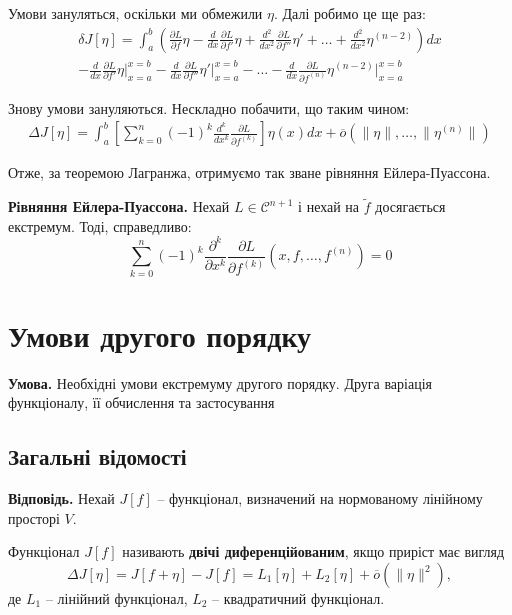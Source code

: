 \documentclass[14pt]{extarticle}
\newcommand{\<}{\langle}
\renewcommand{\>}{\rangle}
\theoremstyle{mystyle}{\newtheorem{definition}{Definition}[section]}
\theoremstyle{mystyle}{\newtheorem{proposition}[definition]{Proposition}}
\theoremstyle{mystyle}{\newtheorem{theorem}[definition]{Theorem}}
\theoremstyle{mystyle}{\newtheorem{lemma}[definition]{Lemma}}
\theoremstyle{mystyle}{\newtheorem{corollary}[definition]{Corollary}}
\theoremstyle{mystyle}{\newtheorem*{remark}{Remark}}
\theoremstyle{mystyle}{\newtheorem*{remarks}{Remarks}}
\theoremstyle{mystyle}{\newtheorem*{example}{Example}}
\theoremstyle{mystyle}{\newtheorem*{examples}{Examples}}
\theoremstyle{definition}{\newtheorem*{exercise}{Exercise}}
\theoremstyle{cstyle}{\newtheorem*{cthm}{}}
\theoremstyle{warn}
\begin{document}
Умови зануляться, оскільки ми обмежили $\eta$. Далі робимо це ще раз:
\begin{gather}
    \delta J[\eta] = \int_a^b \left(\frac{\partial L}{\partial f}\eta - \frac{d}{dx}\frac{\partial L}{\partial f'}\eta + \frac{d^2}{dx^2}\frac{\partial L}{\partial f''}\eta' + \dots +\frac{d^2}{dx^2}\eta^{(n-2)}\right)dx \nonumber \\
    - \frac{d}{dx}\frac{\partial L}{\partial f'}\eta\Big|_{x=a}^{x=b} - \frac{d}{dx}\frac{\partial L}{\partial f''}\eta'\Big|_{x=a}^{x=b} - \dots - \frac{d}{dx}\frac{\partial L}{\partial f^{(n)}}\eta^{(n-2)}\Big|_{x=a}^{x=b}
\end{gather}

Знову умови зануляються. Нескладно побачити, що таким чином:
\begin{gather}
    \Delta J[\eta] = \int_a^b\left[\sum_{k=0}^n (-1)^k \frac{d^k}{dx^k}\frac{\partial L}{\partial f^{(k)}}\right]\eta(x)dx + \overline{o}(\|\eta\|,\dots,\|\eta^{(n)}\|)
\end{gather}

Отже, за теоремою Лагранжа, отримуємо так зване рівняння Ейлера-Пуассона.

\begin{theorem}
\textbf{Рівняння Ейлера-Пуассона.} Нехай $L \in \mathcal{C}^{n+1}$ і нехай на $\widetilde{f}$ досягається екстремум. Тоді, справедливо:
\begin{equation}
    \sum_{k=0}^n (-1)^k \frac{\partial^k}{\partial x^k} \frac{\partial L}{\partial f^{(k)}}(x,f,\dots,f^{(n)}) = 0
\end{equation}
\end{theorem}

\pagebreak

\section{Умови другого порядку}

\textbf{Умова.} Необхідні умови екстремуму другого порядку. Друга варіація функціоналу, її обчислення
та застосування

\subsection{Загальні відомості}

\textbf{Відповідь.} Нехай $J[f]$ -- функціонал, визначений на нормованому лінійному просторі $V$. 

\begin{definition}
    Функціонал $J[f]$ називають \textbf{двічі диференційованим}, якщо приріст має вигляд
    \begin{equation}
        \Delta J[\eta] = J[f+\eta]-J[f] = L_1[\eta] + L_2[\eta] + \overline{o}(\|\eta\|^2),
    \end{equation}
    де $L_1$ -- лінійний функціонал, $L_2$ -- квадратичний функціонал.
\end{definition}
\end{document}
